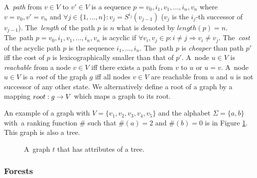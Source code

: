 \documentclass[a4paper, 12pt]{article}
\begin{document}
A~\emph{path} from $v\in V$ to $v' \in V$ is a sequence $p=v_0, i_1, v_1, \ldots, i_n, v_n$ where $v=v_0, v' = v_n$
and $\forall j \in \{1,\ldots,n\}: v_j = S^{i_j}(v_{j-1})$ ($v_j$ is the $i_j$-th successor of $v_{j-1}$).
The~\emph{length} of the path $p$ is $n$ what is denoted by $length(p) = n$.
The~path $p=v_0,i_1,v_1,\ldots,i_n,v_n$ is acyclic if $\forall v_i,v_j \in p: i \neq j \Rightarrow v_i \neq v_j$.
The~\emph{cost} of the acyclic path $p$ is the sequence $i_1, \ldots, i_n$.
The~path $p$ is \emph{cheaper} than path $p'$ iff the cost of $p$ is lexicographically smaller than that of $p'$. 
A~node $u \in V$ is \emph{reachable} from a node $v \in V$ iff there exists a path from $v$ to $u$ or $u=v$.
A~node $u \in V$ is a \emph{root} of the graph $g$ iff all nodes $v \in V$ are reachable from $u$
and $u$ is not successor of any other state.
We alternatively define a root of a graph by a mapping $root: g \rightarrow V$
which maps a graph to its root.

An example of a graph with $V=\{v_1,v_2,v_3,v_4,v_5\}$ and
the alphabet $\Sigma = \{a,b\}$ with~a ranking function $\#$ such that $\#(a) = 2$ and $\#(b) = 0$
is in Figure \ref{fig:graph_tree}.
This graph is also a tree.

	\begin{figure}[bth]
		\begin{center}
			
		\end{center}
		\caption{A~graph $t$ that has attributes of a tree.}
		\label{fig:graph_tree}
	\end{figure}
	\label{ex:graph}

\subsubsection{Forests}
\label{subsec:forests}
\end{document}
